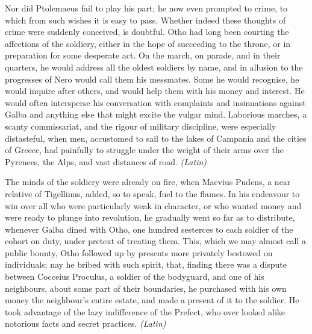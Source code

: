 
Nor did Ptolemaeus fail to play his part; he now even prompted to crime, to which from such wishes it is easy to pass. Whether indeed these thoughts of crime were suddenly conceived, is doubtful. Otho had long been courting the affections of the soldiery, either in the hope of succeeding to the throne, or in preparation for some desperate act. On the march, on parade, and in their quarters, he would address all the oldest soldiers by name, and in allusion to the progresses of Nero would call them his messmates. Some he would recognise, he would inquire after others, and would help them with his money and interest. He would often intersperse his conversation with complaints and insinuations against Galba and anything else that might excite the vulgar mind. Laborious marches, a scanty commissariat, and the rigour of military discipline, were especially distasteful, when men, accustomed to sail to the lakes of Campania and the cities of Greece, had painfully to struggle under the weight of their arms over the Pyrenees, the Alps, and vast distances of road. \emph{(Latin)}


The minds of the soldiery were already on fire, when Maevius Pudens, a near relative of Tigellinus, added, so to speak, fuel to the flames. In his endeavour to win over all who were particularly weak in character, or who wanted money and were ready to plunge into revolution, he gradually went so far as to distribute, whenever Galba dined with Otho, one hundred sesterces to each soldier of the cohort on duty, under pretext of treating them. This, which we may almost call a public bounty, Otho followed up by presents more privately bestowed on individuals; nay he bribed with such spirit, that, finding there was a dispute between Cocceius Proculus, a soldier of the bodyguard, and one of his neighbours, about some part of their boundaries, he purchased with his own money the neighbour's entire estate, and made a present of it to the soldier. He took advantage of the lazy indifference of the Prefect, who over looked alike notorious facts and secret practices. \emph{(Latin)}


